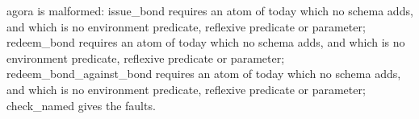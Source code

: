 agora
is malformed:
issue_bond
requires an atom of
today
which no schema adds, and which is no environment predicate, reflexive predicate or parameter;
redeem_bond
requires an atom of
today
which no schema adds, and which is no environment predicate, reflexive predicate or parameter;
redeem_bond_against_bond
requires an atom of
today
which no schema adds, and which is no environment predicate, reflexive predicate or parameter;
check_named gives the faults.
